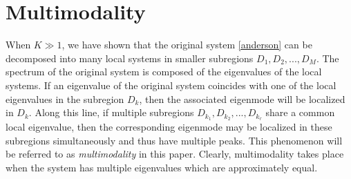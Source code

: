 \documentclass[a4paper,11pt]{article}
\begin{document}
\section{Multimodality}\label{multimodality}
When $K\gg 1$, we have shown that the original system \eqref{anderson} can be decomposed into many local systems in smaller subregions $D_1, D_2, ..., D_M$. The spectrum of the original system is composed of the eigenvalues of the local systems. If an eigenvalue of the original system coincides with one of the local eigenvalues in the subregion $D_k$, then the associated eigenmode will be localized in $D_k$. Along this line, if multiple subregions $D_{k_1}, D_{k_2}, ..., D_{k_r}$ share a common local eigenvalue, then the corresponding eigenmode may be localized in these subregions simultaneously and thus have multiple peaks. This phenomenon will be referred to as \emph{multimodality} in this paper. Clearly, multimodality takes place when the system has multiple eigenvalues which are approximately equal.
\end{document}
